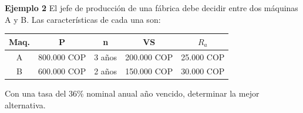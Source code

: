 \textbf{Ejemplo 2}\newline
El jefe de producción de una fábrica debe decidir entre dos máquinas A y B. Las características de cada una son: \\
\begin{center}
		\begin{tabular}{|c|c|c|c|c|}
			\hline
			\rowcolor[HTML]{FFB183}
			\textbf{Maq.} & \textbf{P} & \textbf{n} & \textbf{VS} & \textbf{$R_a$} \\ \hline
			A            & 800.000 COP   & 3 años     & 200.000 COP    & 25.000 COP       \\ \hline
			B            & 600.000 COP   & 2 años     & 150.000 COP    & 30.000 COP       \\ \hline
		\end{tabular}
\end{center}

Con una tasa del 36\% nominal anual año vencido, determinar la mejor alternativa.

